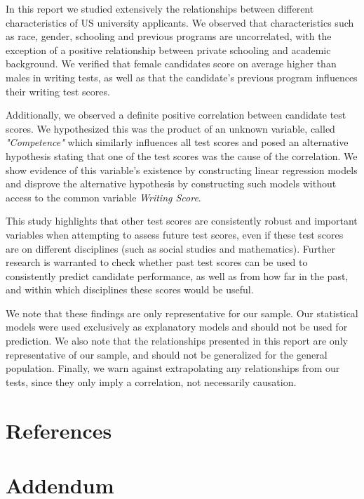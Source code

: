 \documentclass[10pt, a4paper]{article}
\begin{document}
	In this report we studied extensively the relationships between different characteristics of US university applicants. We observed that characteristics such as race, gender, schooling and previous programs are uncorrelated, with the exception of a positive relationship between private schooling and academic background. We verified that female candidates score on average higher than males in writing tests, as well as that the candidate's previous program influences their writing test scores. 
	
	Additionally, we observed a definite positive correlation between candidate test scores. We hypothesized this was the product of an unknown variable, called \textit{"Competence"} which similarly influences all test scores and posed an alternative hypothesis stating that one of the test scores was the cause of the correlation. We show evidence of this variable's existence by constructing linear regression models and disprove the alternative hypothesis by constructing such models without access to the common variable \textit{Writing Score}.
	
	This study highlights that other test scores are consistently robust and important variables when attempting to assess future test scores, even if these test scores are on different disciplines (such as social studies and mathematics). Further research is warranted to check whether past test scores can be used to consistently predict candidate performance, as well as from how far in the past, and within which disciplines these scores would be useful.
	
	We note that these findings are only representative for our sample. Our statistical models were used exclusively as explanatory models and should not be used for prediction. We also note that the relationships presented in this report are only representative of our sample, and should not be generalized for the general population. Finally, we warn against extrapolating any relationships from our tests, since they only imply a correlation, not necessarily causation.
	
	
	\section{References}
	\printbibliography[heading=none]
	
	\newpage
	\section{Addendum}
	\label{sec::addendum}
	
\end{document}
